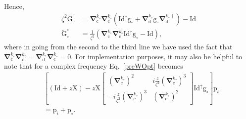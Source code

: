 \documentclass[reprint,aps,prb]{revtex4-2}
\newcommand{\bmm}[1]{\bm{\mathrm{#1}}}
\begin{document}
Hence, 
\begin{align}
	\zeta^{2}\breve{\bmm{G}}^{\circ}_{\circ} &= 
	\bm{\nabla}_{\bmm{c}}^{k_{\circ}}\bm{\nabla}_{\bmm{c}}^{k_{\circ}}\left( 
	\bmm{Id}^{\uparrow} \bmm{g}_{\circ} + \bm{\nabla}_{\bmm{d}}^{k_{\circ}} \bmm{g}_{\circ} \bm{\nabla}_{\bmm{d}}^{k_{\circ}\dagger}\right) - \bmm{Id}
	\label{compGreenForm} \\
	\breve{\bmm{G}}^{\circ}_{\circ} &= \frac{1}{\zeta^{2}} \left(\bm{\nabla}_{\bmm{c}}^{k_{\circ}}\bm{\nabla}_{\bmm{c}}^{k_{\circ}}\bmm{Id}^{\uparrow} \bmm{g}_{\circ} - \bmm{Id}\right),
	\nonumber
\end{align}
where in going from the second to the third line we have used the fact that $\bm{\nabla}_{\bmm{c}}^{k_{\circ}}\bm{\nabla}_{\bmm{d}}^{k_{\circ}} = \bm{\nabla}_{\bmm{d}}^{k_{\circ}}\bm{\nabla}_{\bmm{c}}^{k_{\circ}} = \bmm{0}$.
For implementation purposes, it may also be helpful to note that for a complex frequency Eq.~\eqref{preWOpt} becomes
\begin{align}
	&\left[\left(\bmm{Id} +z\bmm{X}\right) - z\bmm{X}
	\begin{bmatrix}
		\left(\bm{\nabla}_{\bmm{c}}^{k_{\circ}}\right)^{2}  & i\frac{z}{\zeta^{2}}\left(\bm{\nabla}_{\bmm{c}}^{k_{\circ}}\right)^{3} \\
		-i\frac{z}{\zeta^{2}}\left(\bm{\nabla}_{\bmm{c}}^{k_{\circ}}\right)^{3} & \left(\bm{\nabla}_{\bmm{c}}^{k_{\circ}}\right)^{2}
	\end{bmatrix}
	\bmm{Id}^{\uparrow}\bmm{g}_{\circ}
	\right]\bmm{p}_{t} 
	\nonumber\\
	&= \bmm{p}_{i} + \bmm{p}_{\circ}.
\end{align}
\end{document}
